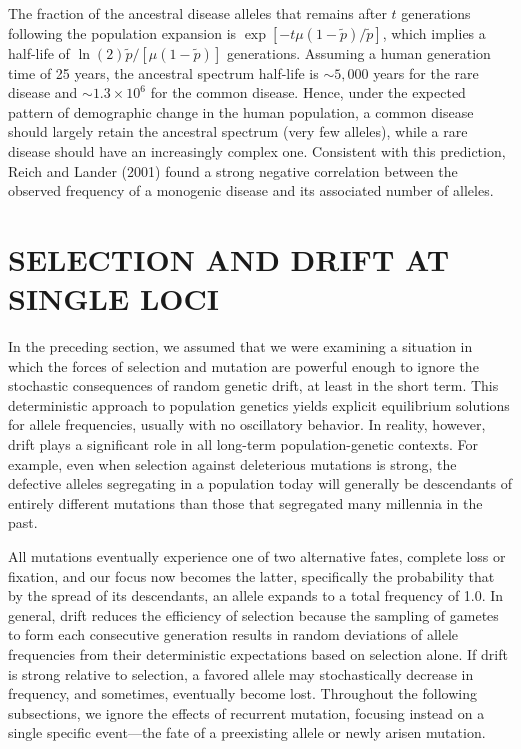 \documentclass{article}
\begin{document}
The fraction of the ancestral disease alleles that remains after $t$ generations following the population expansion is $\exp[-t\mu(1-\tilde{p})/\tilde{p}]$, which implies a half-life of $\ln(2)\tilde{p}/[\mu(1-\tilde{p})]$ generations. Assuming a human generation time of 25 years, the ancestral spectrum half-life is $\sim5{,}000$ years for the rare disease and $\sim1.3\times10^{6}$ for the common disease. Hence, under the expected pattern of demographic change in the human population, a common disease should largely retain the ancestral spectrum (very few alleles), while a rare disease should have an increasingly complex one. Consistent with this prediction, Reich and Lander (2001) found a strong negative correlation between the observed frequency of a monogenic disease and its associated number of alleles.

\section{SELECTION AND DRIFT AT SINGLE LOCI}
In the preceding section, we assumed that we were examining a situation in which the forces of selection and mutation are powerful enough to ignore the stochastic consequences of random genetic drift, at least in the short term. This deterministic approach to population genetics yields explicit equilibrium solutions for allele frequencies, usually with no oscillatory behavior. In reality, however, drift plays a significant role in all long-term population-genetic contexts. For example, even when selection against deleterious mutations is strong, the defective alleles segregating in a population today will generally be descendants of entirely different mutations than those that segregated many millennia in the past.

All mutations eventually experience one of two alternative fates, complete loss or fixation, and our focus now becomes the latter, specifically the probability that by the spread of its descendants, an allele expands to a total frequency of 1.0. In general, drift reduces the efficiency of selection because the sampling of gametes to form each consecutive generation results in random deviations of allele frequencies from their deterministic expectations based on selection alone. If drift is strong relative to selection, a favored allele may stochastically decrease in frequency, and sometimes, eventually become lost. Throughout the following subsections, we ignore the effects of recurrent mutation, focusing instead on a single specific event—the fate of a preexisting allele or newly arisen mutation.
\end{document}
